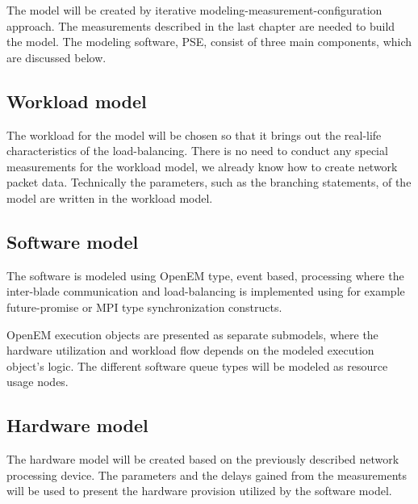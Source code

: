 The model will be created by iterative modeling-measurement-configuration approach. The measurements described in the last chapter are needed to build the model. The modeling software, PSE, consist of three main components, which are discussed below.

\subsection{Workload model}
The workload for the model will be chosen so that it brings out the real-life characteristics of the load-balancing. There is no need to conduct any special measurements for the workload model, we already know how to create network packet data. Technically the parameters, such as the branching statements, of the model are written in the workload model.

\subsection{Software model}
The software is modeled using OpenEM type, event based, processing where the inter-blade communication and load-balancing is implemented using for example future-promise or MPI type synchronization constructs.

OpenEM execution objects are presented as separate submodels, where the hardware utilization and workload flow depends on the modeled execution object's logic. The different software queue types will be modeled as resource usage nodes.

\subsection{Hardware model}
The hardware model will be created based on the previously described network processing device. The parameters and the delays gained from the measurements will be used to present the hardware provision utilized by the software model.

